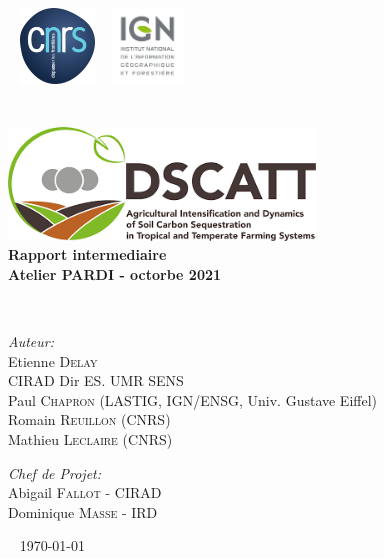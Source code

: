 \begin{titlepage}
\begin{center}

\logoCirad ~ \includegraphics[height=20mm]{./logo/cnrs.png} ~ \includegraphics[height=20mm]{./logo/ign.png}\\[4cm]


\textsc{\Large }\\[0.5cm]

\HRule \\[0.4cm]
\includegraphics[height=30mm]{./logo/DSCATT.png}\\
{\huge \bfseries Rapport intermediaire \\
 Atelier PARDI - octorbe 2021 \\[0.4cm] }

\HRule \\[1.5cm]


\begin{minipage}{0.4\textwidth}
\begin{flushleft} \large
\emph{\textcolor{gris}{Auteur:}}\\
Etienne \textsc{Delay}\\
\textcolor{vert}{CIRAD Dir ES. UMR SENS}\\
Paul \textsc{Chapron} (LASTIG, IGN/ENSG, Univ. Gustave Eiffel)\\
Romain \textsc{Reuillon} (CNRS)\\
Mathieu \textsc{Leclaire} (CNRS)
\end{flushleft}
\end{minipage}
\begin{minipage}{0.4\textwidth}
\begin{flushright} \large
\emph{\textcolor{gris}{Chef de Projet:}} \\
Abigail \textsc{Fallot} - CIRAD\\
Dominique \textsc{Masse} - IRD
\end{flushright}
\end{minipage}

\vfill

\logoRF ~ \partnerFr
{\large \today}

\end{center}
\end{titlepage}
